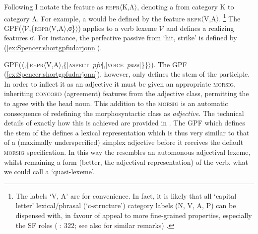 \documentclass[output=paper]{langsci/langscibook}
\begin{document}
Following %
\citet{Spencer17:Russptcps} %
%
I notate the feature  as \textsc{repr}$\langle$Κ,Λ$\rangle$, denoting a  from category Κ to category Λ. For example, a  would be defined by the feature \textsc{repr}$\langle$V,A$\rangle$.%
\footnote{%
\label{ex:Spencer:cats}The labels `V, A' are for convenience. In fact, it is likely that all `capital letter' lexical/phrasal (`c-structure') category labels (N, V, A, P) can be dispensed with, in favour of appeal to more fine-grained properties, especially the SF roles %
(%
\citealt{Spencer98:redundancy,Spencer99:transpositions,Spencer13}: 322; see also \citealt{Chaves14:grammalign} for similar remarks)
%
.
} %
 The GPF($\langle$$\mathcal{V}$,\{\textsc{repr}$\langle$V,A$\rangle$,σ\}$\rangle$) applies to a verb lexeme $\mathcal{V}$ and defines a  realizing features σ. For instance, the  perfective passive   from  `hit, strike' is defined by (\ref{ex:Spencer:shortgpfudarjonn}).%

 \ea

 \label{ex:Spencer:shortgpfudarjonn}

 GPF($\langle$,\{\textsc{repr}$\langle$V,A$\rangle$,\{[\textsc{aspect}~\textit{pfv}],[\textsc{voice}~\textit{pass}]\}\}$\rangle$).
 \z
 The GPF (\ref{ex:Spencer:shortgpfudarjonn}), however, only defines  the stem of the participle. In order to inflect it as an adjective it must be given an appropriate \textsc{morsig}, inheriting \textsc{concord} (agreement) features from the adjective class, permitting the  to agree with the head noun. This addition to the \textsc{morsig} is an automatic consequence of redefining the morphosyntactic class as \textit{adjective}.  The technical details of exactly how this is achieved are provided in %
\citet{Spencer17:Russptcps}%
%
. The GPF which defines the stem of the  defines a lexical representation which is thus very similar to that of a (maximally underspecified) simplex adjective before it receives the default \textsc{morsig} specification. In this way the  resembles an automonous adjectival lexeme, whilst remaining a form (better, the adjectival representation) of the verb, what we could call a `quasi-lexeme'.
\end{document}
